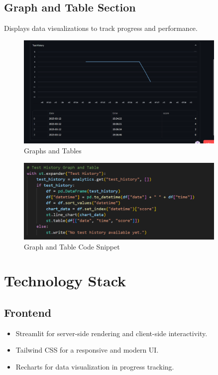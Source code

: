 \documentclass{report}
\begin{document}
\subsection{Graph and Table Section}
Displays data visualizations to track progress and performance.
\begin{figure}[H]
\centering
\includegraphics[width=0.9\textwidth]{graph-table.png}
\caption{Graphs and Tables}
\end{figure}
\begin{figure}[H]
\centering
\includegraphics[width=0.9\textwidth]{graph-table-code.png}
\caption{Graph and Table Code Snippet}
\end{figure}

\section{Technology Stack}
\subsection{Frontend}
\begin{itemize}
    \item Streamlit for server-side rendering and client-side interactivity.
    \item Tailwind CSS for a responsive and modern UI.
    \item Recharts for data visualization in progress tracking.
\end{itemize}
\end{document}
